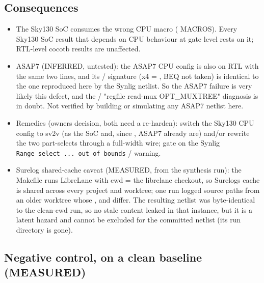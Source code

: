 \subsection{Consequences}\label{cr:defect:sky130-cpu-synlig-dud4:consequences}

\begin{record}

\begin{itemize}
\tightlist
\item
  The Sky130 SoC consumes the wrong CPU macro
  ( MACROS). Every Sky130 SoC result
  that depends on CPU behaviour at gate level rests on it; RTL-level
  cocotb results are unaffected.
\item
  ASAP7 (INFERRED, untested): the ASAP7 CPU config is also
   on RTL with the same two lines, and its
  / signature (x4 = , BEQ not taken) is
  identical to the one reproduced here by the Synlig netlist. So the
  ASAP7 failure is very likely this defect, and the
  / "regfile read-mux OPT\_\allowbreak{}MUXTREE"
  diagnosis is in doubt. Not verified by building or simulating any
  ASAP7 netlist here.
\item
  Remedies (owner\textquotesingle s decision, both need a re-harden):
  switch the Sky130 CPU config to sv2v (as the SoC and, since
  , ASAP7 already are) and/or rewrite the two part-selects
  through a full-width wire; gate on the Synlig
  \texttt{Range\ select\ .\allowbreak{}.\allowbreak{}.\allowbreak{}\ out\ of\ bounds}
  /  warning.
\item
  Surelog shared-cache caveat (MEASURED, from the synthesis run): the
  Makefile runs LibreLane with cwd = the librelane checkout, so
  Surelog\textquotesingle s  cache is shared across every
  project and worktree; one run logged source paths from an older
  worktree whose ,  and
   differ. The resulting netlist was
  byte-identical to the clean-cwd run, so no stale content leaked in
  that instance, but it is a latent hazard and cannot be excluded for
  the committed netlist (its run directory is gone).
\end{itemize}

\end{record}

\subsection{Negative control, on a clean baseline (MEASURED)}\label{cr:defect:sky130-cpu-synlig-dud4:negative-control-on-a-clean-baseline-measured}

